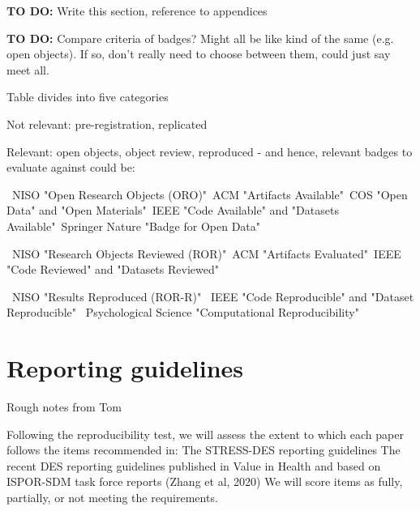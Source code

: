 \textbf{TO DO:} Write this section, reference to appendices

\textbf{TO DO:} Compare criteria of badges? Might all be like kind of the same (e.g. open objects). If so, don't really need to choose between them, could just say meet all.

Table divides into five categories

Not relevant: pre-registration, replicated

Relevant: open objects, object review, reproduced - and hence, relevant badges to evaluate against could be:

\textbullet\ NISO "Open Research Objects (ORO)"\newline \textbullet\ ACM "Artifacts Available"\newline \textbullet\ COS "Open Data" and "Open Materials"\newline \textbullet\ IEEE "Code Available" and "Datasets Available"\newline \textbullet\ Springer Nature "Badge for Open Data"

\textbullet\ NISO "Research Objects Reviewed (ROR)"\newline \textbullet\ ACM "Artifacts Evaluated"\newline \textbullet\ IEEE "Code Reviewed" and "Datasets Reviewed"

\textbullet\ NISO "Results Reproduced (ROR-R)" \newline \textbullet\ IEEE "Code Reproducible" and "Dataset Reproducible" \newline \textbullet\ Psychological Science "Computational Reproducibility"
            
\section{Reporting guidelines}


Rough notes from Tom

Following the reproducibility test, we will assess the extent to which each paper follows the items recommended in:
The STRESS-DES reporting guidelines
The recent DES reporting guidelines published in Value in Health and based on ISPOR-SDM task force reports (Zhang et al, 2020)
We will score items as fully, partially, or not meeting the requirements.

